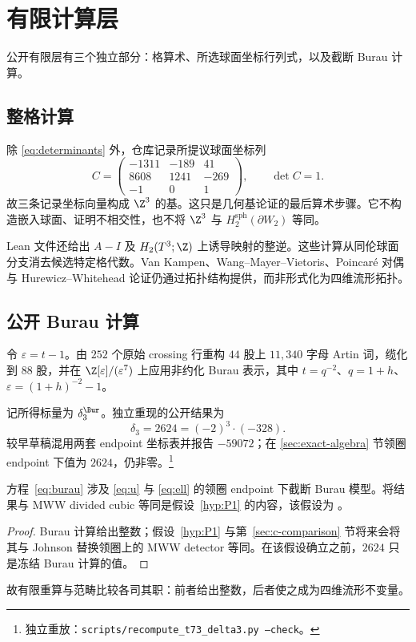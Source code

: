 \section{有限计算层}

公开有限层有三个独立部分：格算术、所选球面坐标行列式，以及截断 Burau 计算。

\subsection{整格计算}

除 \eqref{eq:determinants} 外，仓库记录所提议球面坐标列
\begin{equation}\label{eq:spherecols}
C=\begin{pmatrix}
-1311&-189&41\\
8608&1241&-269\\
-1&0&1
\end{pmatrix},
\qquad \det C=1.
\end{equation}
故三条记录坐标向量构成 $\Z^3$ 的基。这只是几何基论证的最后算术步骤。它不构造嵌入球面、证明不相交性，也不将 $\Z^3$ 与 $H_2^{\mathrm{sph}}(\partial W_2)$ 等同。

Lean 文件还给出 $A-I$ 及 $H_2(T^3;\Z)$ 上诱导映射的整逆。这些计算从同伦球面分支消去候选特定格代数。Van Kampen、Wang--Mayer--Vietoris、Poincaré 对偶与 Hurewicz--Whitehead 论证仍通过拓扑结构提供，而非形式化为四维流形拓扑。

\subsection{公开 Burau 计算}

令 $\varepsilon=t-1$。由 $252$ 个原始 crossing 行重构 $44$ 股上 $11{,}340$ 字母 Artin 词，缆化到 $88$ 股，并在 $\Z[\varepsilon]/(\varepsilon^7)$ 上应用非约化 Burau 表示，其中 $t=q^{-2}$、$q=1+h$、$\varepsilon=(1+h)^{-2}-1$。

记所得标量为 $\delta_3^{\Bur}$。独立重现的公开结果为
\begin{equation}\label{eq:burau}
\delta_3=2624=(-2)^3\cdot(-328).
\end{equation}
较早草稿混用两套 endpoint 坐标表并报告 $-59072$；在 \ref{sec:exact-algebra} 节领圈 endpoint 下值为 $2624$，仍非零。\footnote{独立重放：\texttt{scripts/recompute\_t73\_delta3.py --check}。}

\begin{proposition}[计算的精确适用范围]\label{prop:scope}
方程~\eqref{eq:burau} 涉及 \eqref{eq:u} 与 \eqref{eq:ell} 的领圈 endpoint 下截断 Burau 模型。将结果与 MWW divided cubic 等同是假设~\ref{hyp:P1} 的内容，该假设为 \Open。
\end{proposition}

\begin{proof}
Burau 计算给出整数；假设~\ref{hyp:P1} 与第~\ref{sec:c-comparison} 节将来会将其与 Johnson 替换领圈上的 MWW detector 等同。在该假设确立之前，$2624$ 只是冻结 Burau 计算的值。
\end{proof}

故有限重算与范畴比较各司其职：前者给出整数，后者使之成为四维流形不变量。


